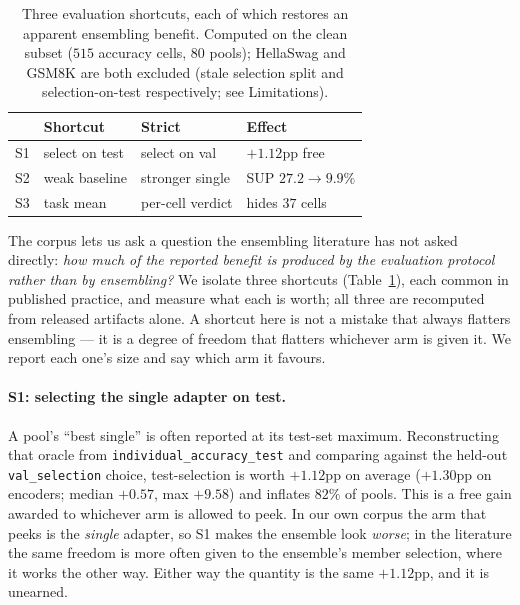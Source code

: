 \documentclass[11pt]{article}
\begin{document}
\begin{table}[t]
\centering\small
\setlength{\tabcolsep}{3.5pt}
\caption{Three evaluation shortcuts, each of which restores an apparent ensembling benefit. Computed on the clean subset ($515$ accuracy cells, $80$ pools); HellaSwag and GSM8K are both excluded (stale selection split and selection-on-test respectively; see Limitations).}
\label{tab:protocol}
\begin{tabular}{@{}llll@{}}
\toprule
& Shortcut & Strict & Effect \\
\midrule
S1 & select on test & select on val & $+1.12$pp free \\
S2 & weak baseline & stronger single & SUP $27.2\!\to\!9.9\%$ \\
S3 & task mean & per-cell verdict & hides $37$ cells \\
\bottomrule
\end{tabular}
\end{table}

The corpus lets us ask a question the ensembling literature has not asked directly: \emph{how much of the reported benefit is produced by the evaluation protocol rather than by ensembling?} We isolate three shortcuts (Table~\ref{tab:protocol}), each common in published practice, and measure what each is worth; all three are recomputed from released artifacts alone. A shortcut here is not a mistake that always flatters ensembling --- it is a degree of freedom that flatters whichever arm is given it. We report each one's size and say which arm it favours.

\paragraph{S1: selecting the single adapter on test.} A pool's ``best single'' is often reported at its test-set maximum. Reconstructing that oracle from \texttt{individual\_\allowbreak accuracy\_\allowbreak test} and comparing against the held-out \texttt{val\_selection} choice, test-selection is worth $+1.12$pp on average ($+1.30$pp on encoders; median $+0.57$, max $+9.58$) and inflates $82\%$ of pools. This is a free gain awarded to whichever arm is allowed to peek. In our own corpus the arm that peeks is the \emph{single} adapter, so S1 makes the ensemble look \emph{worse}; in the literature the same freedom is more often given to the ensemble's member selection, where it works the other way. Either way the quantity is the same $+1.12$pp, and it is unearned.
\end{document}
